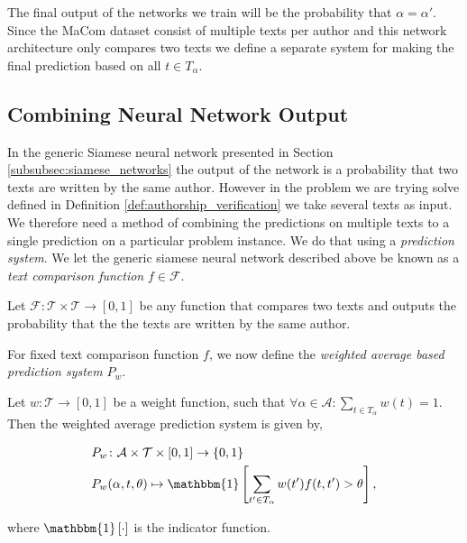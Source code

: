 The final output of the networks we train will be the probability that $\alpha =
\alpha'$. Since the MaCom dataset consist of multiple texts per author and this
network architecture only compares two texts we define a separate system for
making the final prediction based on all $t \in T_\alpha$.


\subsection{Combining Neural Network Output}
\label{subsec:combining_neural_network_output}

In the generic Siamese neural network presented in Section
\ref{subsubsec:siamese_networks} the output of the network is a probability
that two texts are written by the same author. However in the problem we are
trying solve defined in Definition \ref{def:authorship_verification} we take
several texts as input. We therefore need a method of combining the predictions
on multiple texts to a single prediction on a particular problem instance. We
do that using a \textit{prediction system}. We let the generic siamese neural
network described above be known as a \textit{text comparison function} $f \in
\mathcal{F}$.

\begin{definition}
    \label{def:text_comparison_function}

    Let $\mathcal{F} \colon \mathcal{T} \times \mathcal{T} \rightarrow [0, 1]$
    be any function that compares two texts and outputs the probability that the
    the texts are written by the same author.

\end{definition}

For fixed text comparison function $f$, we now define the \textit{weighted
average based prediction system} $P_w$.

\begin{definition}
    \label{def:weighted_average_prediction_system}

    Let $w: \mathcal{T} \rightarrow [0, 1]$ be a weight function, such that
    $\forall \alpha \in \mathcal{A}: \sum_{t \in T_\alpha} w(t) = 1$. Then the
    weighted average prediction system is given by,

    \begin{align}
        &P_w \colon \mathcal{A} \times \mathcal{T} \times [0, 1] \rightarrow
            \{0, 1\} \\
        &P_w(\alpha, t, \theta) \mapsto \mathbbm{1}\left[
                \sum_{t' \in T_\alpha} w(t') f(t, t') > \theta
            \right],
    \end{align}

    where $\mathbbm{1}\left[\cdot\right]$ is the indicator function.

\end{definition}

